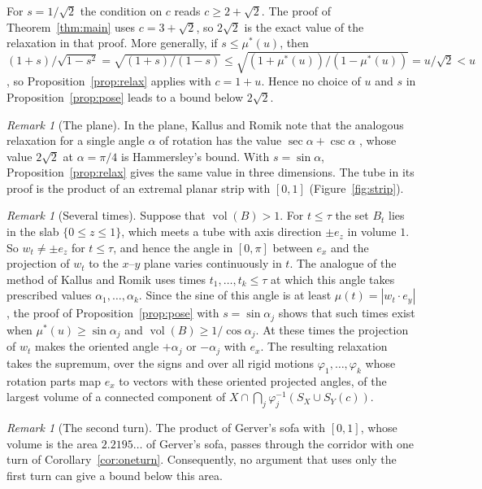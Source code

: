 \documentclass[11pt]{amsart}
\theoremstyle{definition}
\theoremstyle{remark}
\newtheorem{remark}[theorem]{Remark}
\numberwithin{equation}{section}
\newcommand{\vol}{\operatorname{vol}}
\begin{document}
For $s=1/\sqrt2$ the condition on $c$ reads $c\ge2+\sqrt2$. The proof of Theorem~\ref{thm:main} uses $c=3+\sqrt2$, so $2\sqrt2$ is the exact value of the relaxation in that proof. More generally, if $s\le\mu^*(u)$, then $(1+s)/\sqrt{1-s^2}=\sqrt{(1+s)/(1-s)}\le\sqrt{(1+\mu^*(u))/(1-\mu^*(u))}=u/\sqrt2<u$, so Proposition~\ref{prop:relax} applies with $c=1+u$. Hence no choice of $u$ and $s$ in Proposition~\ref{prop:pose} leads to a bound below $2\sqrt2$.

\begin{remark}[The plane]\label{rem:plane}
In the plane, Kallus and Romik note that the analogous relaxation for a single angle $\alpha$ of rotation has the value $\sec\alpha+\csc\alpha$ \cite[(12)]{KR18}, whose value $2\sqrt2$ at $\alpha=\pi/4$ is Hammersley's bound. With $s=\sin\alpha$, Proposition~\ref{prop:relax} gives the same value in three dimensions. The tube in its proof is the product of an extremal planar strip with $[0,1]$ (Figure~\ref{fig:strip}).
\end{remark}

\begin{remark}[Several times]\label{rem:several}
Suppose that $\vol(B)>1$. For $t\le\tau$ the set $B_t$ lies in the slab $\{0\le z\le1\}$, which meets a tube with axis direction $\pm e_z$ in volume $1$. So $w_t\ne\pm e_z$ for $t\le\tau$, and hence the angle in $[0,\pi]$ between $e_x$ and the projection of $w_t$ to the $x$--$y$ plane varies continuously in $t$. The analogue of the method of Kallus and Romik uses times $t_1,\dots,t_k\le\tau$ at which this angle takes prescribed values $\alpha_1,\dots,\alpha_k$. Since the sine of this angle is at least $\mu(t)=|w_t\cdot e_y|$, the proof of Proposition~\ref{prop:pose} with $s=\sin\alpha_j$ shows that such times exist when $\mu^*(u)\ge\sin\alpha_j$ and $\vol(B)\ge1/\cos\alpha_j$. At these times the projection of $w_t$ makes the oriented angle $+\alpha_j$ or $-\alpha_j$ with $e_x$. The resulting relaxation takes the supremum, over the signs and over all rigid motions $\varphi_1,\dots,\varphi_k$ whose rotation parts map $e_x$ to vectors with these oriented projected angles, of the largest volume of a connected component of $X\cap\bigcap_j\varphi_j^{-1}(S_X\cup S_Y(c))$.
\end{remark}

\begin{remark}[The second turn]\label{rem:secondturn}
The product of Gerver's sofa \cite{Ger92} with $[0,1]$, whose volume is the area $2.2195\ldots$ of Gerver's sofa, passes through the corridor with one turn of Corollary~\ref{cor:oneturn}. Consequently, no argument that uses only the first turn can give a bound below this area.
\end{remark}
\end{document}
